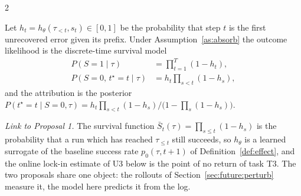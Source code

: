 \begin{multicols}{2}
\begin{definition}\label{def:hazard}
Let $h_t=h_\theta(\tau_{<t},s_t)\in[0,1]$ be the probability that step $t$ is the first unrecovered error given its prefix. Under Assumption~\ref{as:absorb} the outcome likelihood is the discrete-time survival model
\begin{align*}
P(S{=}1\mid\tau)&=\textstyle\prod_{t=1}^{T}(1-h_t),\\
P(S{=}0,\,t^\star{=}t\mid\tau)&=h_t\textstyle\prod_{s<t}(1-h_s),
\end{align*}
and the attribution is the posterior
$P(t^\star{=}t\mid S{=}0,\tau)=h_t\prod_{s<t}(1-h_s)\big/\big(1-\prod_{s}(1-h_s)\big)$.
\end{definition}

\emph{Link to Proposal 1.} The survival function $\bar S_t(\tau)=\prod_{s\le t}(1-h_s)$ is the probability that a run which has reached $\tau_{\le t}$ still succeeds, so $h_\theta$ is a learned surrogate of the baseline success rate $p_0(\tau,t{+}1)$ of Definition~\ref{def:effect}, and the online lock-in estimate of U3 below is the point of no return of task T3. The two proposals share one object: the rollouts of Section~\ref{sec:future:perturb} measure it, the model here predicts it from the log.


\end{multicols}
